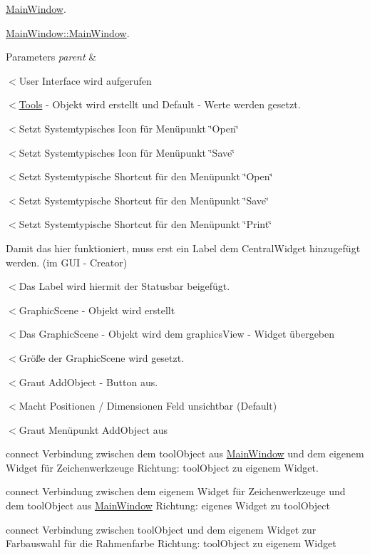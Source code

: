 \hyperlink{class_main_window}{Main\+Window}. 

\hyperlink{class_main_window_a8b244be8b7b7db1b08de2a2acb9409db}{Main\+Window\+::\+Main\+Window}.


\begin{DoxyParams}{Parameters}
{\em parent} & \\
\hline
\end{DoxyParams}
$<$User Interface wird aufgerufen

$<$\hyperlink{class_tools}{Tools} -\/ Objekt wird erstellt und Default -\/ Werte werden gesetzt.

$<$Setzt Systemtypisches Icon für Menüpunkt \char`\"{}\+Open\char`\"{}

$<$Setzt Systemtypisches Icon für Menüpunkt \char`\"{}\+Save\char`\"{}

$<$Setzt Systemtypische Shortcut für den Menüpunkt \char`\"{}\+Open\char`\"{}

$<$Setzt Systemtypische Shortcut für den Menüpunkt \char`\"{}\+Save\char`\"{}

$<$Setzt Systemtypische Shortcut für den Menüpunkt \char`\"{}\+Print\char`\"{}

Damit das hier funktioniert, muss erst ein Label dem Central\+Widget hinzugefügt werden. (im G\+UI -\/ Creator)

$<$Das Label wird hiermit der Statusbar beigefügt.

$<$Graphic\+Scene -\/ Objekt wird erstellt

$<$Das Graphic\+Scene -\/ Objekt wird dem graphics\+View -\/ Widget übergeben

$<$Größe der Graphic\+Scene wird gesetzt.

$<$Graut Add\+Object -\/ Button aus.

$<$Macht Positionen / Dimensionen Feld unsichtbar (Default)

$<$Graut Menüpunkt Add\+Object aus

connect Verbindung zwischen dem tool\+Object aus \hyperlink{class_main_window}{Main\+Window} und dem eigenem Widget für Zeichenwerkzeuge Richtung\+: tool\+Object zu eigenem Widget.

connect Verbindung zwischen dem eigenem Widget für Zeichenwerkzeuge und dem tool\+Object aus \hyperlink{class_main_window}{Main\+Window} Richtung\+: eigenes Widget zu tool\+Object

connect Verbindung zwischen tool\+Object und dem eigenem Widget zur Farbauswahl für die Rahmenfarbe Richtung\+: tool\+Object zu eigenem Widget

